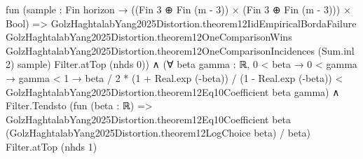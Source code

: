 \documentclass[10pt]{article}
\begin{document}
\begin{ReviewVerbatim}
                            fun (sample : Fin horizon → ((Fin 3 ⊕ Fin (m - 3)) × (Fin 3 ⊕ Fin (m - 3))) × Bool) =>
                            GolzHaghtalabYang2025Distortion.theorem12IidEmpiricalBordaFailure
                              GolzHaghtalabYang2025Distortion.theorem12OneComparisonWins
                              GolzHaghtalabYang2025Distortion.theorem12OneComparisonIncidences (Sum.inl 2) sample)
                        Filter.atTop (nhds 0)) ∧
  (∀ {beta gamma : ℝ},
      0 < beta →
        0 < gamma →
          gamma < 1 →
            beta / 2 * (1 + Real.exp (-beta)) / (1 - Real.exp (-beta)) <
              GolzHaghtalabYang2025Distortion.theorem12Eq10Coefficient beta gamma) ∧
    Filter.Tendsto
      (fun (beta : ℝ) =>
        GolzHaghtalabYang2025Distortion.theorem12Eq10Coefficient beta
            (GolzHaghtalabYang2025Distortion.theorem12LogChoice beta) /
          beta)
      Filter.atTop (nhds 1)
\end{ReviewVerbatim}
\end{document}
